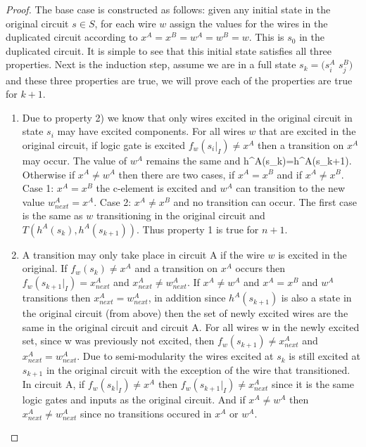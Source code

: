 \documentclass{article}
\begin{document}
\begin{proof}
The base case is constructed as follows:  given any initial state in the original circuit $s \in S$, for each wire $w$ assign the values for the wires in the duplicated circuit according to $x^A=x^B=w^A=w^B=w$.  This is $s_0$ in the duplicated circuit.  It is simple to see that this initial state satisfies all three properties.  %
\newline
Next is the induction step, assume we are in a full state $s_k=(s_i^A$ $s_j^B)$ and these three properties are true, we will prove each of the properties are true for $k+1$. 
\begin{enumerate} %
\item  Due to property 2) we know that only wires excited in the original circuit in state $s_i$ may have excited components.  For all wires $w$ that are excited in the original circuit, if logic gate is excited $f_w(s_i|_I)\neq x^A$ then a transition on $x^A$ may occur.  The value of $w^A$ remains the same and h^A(s_k)=h^A(s_{k+1}).  Otherwise if $x^A \neq w^A$ then there are two cases, if $x^A = x^B$ and if $x^A \neq x^B$. Case 1: $x^A = x^B$ the c-element is excited and $w^A$ can transition to the new value $w_{next}^A=x^A$.  Case 2: $x^A \neq x^B$ and no transition can occur. The first case is the same as $w$ transitioning in the original circuit and $T(h^A(s_k), h^A(s_{k+1}))$.  Thus property 1 is true for $n+1$.
\item  A transition may only take place in circuit A if the wire $w$ is excited in the original.   If $f_w
(s_k)\neq x^A$ and a transition on $x^A$ occurs then $f_w(s_{k+1}|_I)= x_{next}^A$ and $x_{next}^A\neq w_{next}^A$.  
If $x^A \neq w^A$ and $x^A = x^B$ and $w^A$ transitions then  $x_{next}^A= w_{next}^A$, in addition since $h^A(s_{k+1})$ is also a state in the original circuit (from above) then the set of newly excited wires are the same in the original circuit and circuit A.  
For all wires w in the newly excited set, since w was previously not excited, then $f_w(s_{k+1})\neq x_{next}^A$ and $x_{next}^A= w_{next}^A$.  Due to semi-modularity the wires excited at $s_k$ is still excited at $s_{k+1}$ in the original circuit with the exception of the wire that transitioned.  In circuit A, if $f_w(s_k|_I)\neq x^A$ then $f_w(s_{k+1}|_I)\neq x_{next}^A$ since it is the same logic gates and inputs as the original circuit.  And if $x^A \neq w^A$ then $x_{next}^A \neq w_{next}^A$ since no transitions occured in $x^A$ or $w^A$. %

\end{enumerate}
\end{proof}
\end{document}
